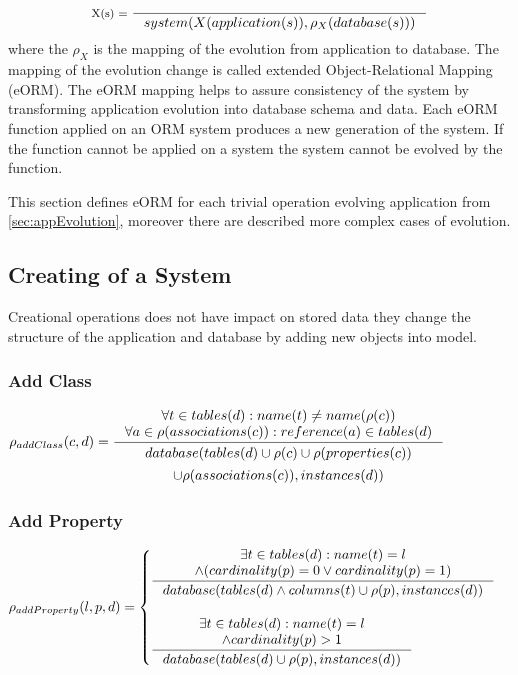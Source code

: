 \documentclass[11pt]{article}
\begin{document}
$$
\inference[X(s) = ]{}{system(X(application(s)), \rho_{X}(database(s))) }
$$
where the $\rho_X$ is the mapping of the evolution from application to database. The mapping of the evolution change is called extended Object-Relational Mapping (eORM). The eORM mapping helps to assure consistency of the system by transforming application evolution into database schema and data. Each eORM function applied on an ORM system produces a new generation of the system. If the function cannot be applied on a system the system cannot be evolved by the function. 

This section defines eORM for each trivial operation evolving application from \ref{sec:appEvolution}, moreover there are described more complex cases of evolution. 
 

\subsection{Creating of a System}
Creational operations does not have impact on stored data they change the structure of the application and database by adding new objects into model.

\subsubsection{Add Class}

$
\rho_{addClass}(c, d) = \inference{\forall t \in tables(d) : name(t) \neq name(\rho(c)) \\
	\forall a \in \rho(associations(c)) : reference(a) \in tables(d) 
}{ %
\begin{gathered}
database(tables(d) \cup \rho(c) \cup \rho(properties(c)) \\ \cup \rho(associations(c)), instances(d))
\end{gathered}
}
$
\subsubsection{Add Property}
$
\rho_{addProperty}(l, p, d) =  \begin{cases}
\inference{\exists t \in tables(d) : name(t) = l \\ \wedge (cardinality(p) = 0 \vee cardinality(p) = 1)}{database(tables(d) \wedge columns(t) \cup \rho(p), instances(d))} 
\\ \\
\inference{\exists t \in tables(d) : name(t) = l \\ \wedge cardinality(p) > 1}{database(tables(d) \cup \rho(p), instances(d))}  
  \end{cases}
$
\end{document}
